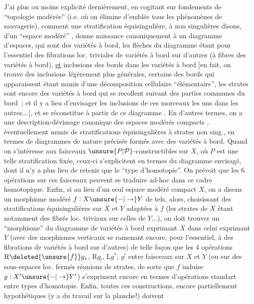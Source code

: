 J'ai plus ou moins explicité dernièrement, en cogitant sur  fondements de ``topologie modérée'' (i.e. où on élimine d'emblée tous les phénomènes de sauvagerie), comment une stratification équisingulière, à  non singulières disons, d'un ``espace modéré'' , donne naissance canoniquement à un diagramme  d'espaces,
qui sont des variétés à bord, les  flèches du diagramme étant pour l'essentiel des fibrations loc. triviales de variétés à bord sur d'autres (à fibres des variétés à bord), \uline{et}  inclusions des bords dans les variétés à bord \deleted{(}[en fait, on trouve des inclusions légèrement plus générales, certains des bords qui apparaissent étant munis d'une décomposition cellulaire ``élémentaire'',   les strates  sont encore des variétés à bord qui se recollent suivant des parties communes du bord~; et il y a lieu d'envisager  les inclusions de ces morceaux les uns dans les autres\ldots.\deleted{)}], et se réconstitue à partir de ce diagramme . En d'autres termes, on a une description-dévissage canonique des espaces modérés compacts , éventuellement munis de stratifications équisingulières à strates non sing., en termes de diagrammes  de nature précisée formés avec des variétés à bord. Quand on s'intéresse aux faisceaux  $\unsure{P|\mathcal{P}}$-constructibles sur $X$, où $P$ est une telle stratification fixée, ceux-ci s'explicitent en termes du diagramme envisagé, dont il
n'y a plus lieu de retenir que le ``type d'homotopie''. On prévoit que les 6 opérations sur ces faisceaux peuvent se traduire ad-hoc dans ce cadre homotopique. Enfin, si au lieu d'un seul espace modéré compact $X$, on a disons un morphisme modéré $f:X\unsure{-|\to}Y$ de tels, alors, choisissant des stratifications équisingulières sur $X$ et $Y$ adaptées à $f$ (les strates de $X$ étant notamment des fibrés loc. triviaux sur celles de $Y\ldots$), on doit trouver un ``morphisme'' du diagramme de variétés à bord exprimant $X$ dans celui exprimant $Y$ (avec des morphismes verticaux se ramenant  encore, pour l'essentiel, à des fibrations de variétés à bord sur d'autres) de telle façon que les 4 opérations $\mathrm{R}\deleted{\unsure{f}}g_*$, $\mathrm{R}g_!$, $\mathrm{L}g^*$, $g^!$ entre faisceaux  sur $X$ et $Y$ (ou sur des sous-espaces loc. fermés  réunions de strates, de sorte que $f$ induise $g:X'\unsure{-|\to}Y'$) s'expriment encore en termes d'opérations standart entre  types d'homotopie. Enfin, toutes ces constructions, encore partiellement hypothétiques (y a du travail  sur la planche!) doivent
